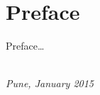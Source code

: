 \chapter*{Preface}

Preface\ldots

\begin{flushright}
{\makeatletter\itshape
    \@firstname\ \@lastname \\
    Pune, January 2015
\makeatother}
\end{flushright}

